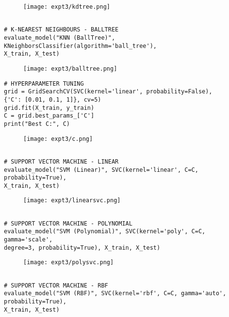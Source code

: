 \documentclass[11pt]{article}
\begin{document}
\begin{figure}[H]
\centering
\texttt{[image: expt3/kdtree.png]} 
\end{figure}

\begin{verbatim}

# K-NEAREST NEIGHBOURS - BALLTREE
evaluate_model("KNN (BallTree)", KNeighborsClassifier(algorithm='ball_tree'), 
X_train, X_test)
\end{verbatim}

\begin{figure}[H]
\centering
\texttt{[image: expt3/balltree.png]} 
\end{figure}

\begin{verbatim}
# HYPERPARAMETER TUNING
grid = GridSearchCV(SVC(kernel='linear', probability=False),
{'C': [0.01, 0.1, 1]}, cv=5)
grid.fit(X_train, y_train)
C = grid.best_params_['C']
print("Best C:", C)
\end{verbatim}

\begin{figure}[H]
\centering
\texttt{[image: expt3/c.png]} 
\end{figure}

\begin{verbatim}

# SUPPORT VECTOR MACHINE - LINEAR
evaluate_model("SVM (Linear)", SVC(kernel='linear', C=C, probability=True), 
X_train, X_test)
\end{verbatim}

\begin{figure}[H]
\centering
\texttt{[image: expt3/linearsvc.png]} 
\end{figure}

\begin{verbatim}

# SUPPORT VECTOR MACHINE - POLYNOMIAL
evaluate_model("SVM (Polynomial)", SVC(kernel='poly', C=C, gamma='scale', 
degree=3, probability=True), X_train, X_test)
\end{verbatim}

\begin{figure}[H]
\centering
\texttt{[image: expt3/polysvc.png]} 
\end{figure}

\begin{verbatim}

# SUPPORT VECTOR MACHINE - RBF
evaluate_model("SVM (RBF)", SVC(kernel='rbf', C=C, gamma='auto', probability=True), 
X_train, X_test)
\end{verbatim}
\end{document}
